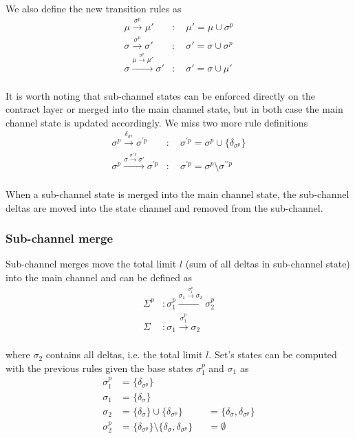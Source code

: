 \documentclass{llncs}
\begin{document}
We also define the new transition rules as
\begin{equation*}
\begin{split}
    \mu \xrightarrow{\sigma^p} \mu' &: \quad \mu' = \mu \cup \sigma^p \\
    \sigma \xrightarrow{\sigma^p} \sigma' &: \quad \sigma' = \sigma \cup \sigma^p \\
    \sigma \xrightarrow{\mu \xrightarrow{\sigma^p} \mu'} \sigma' &: \quad \sigma' = \sigma \cup \mu' \\
\end{split}
\end{equation*}

It is worth noting that sub-channel states can be enforced directly on the contract layer or merged into the main channel state, but in both case the main channel state is updated accordingly. We miss two more rule definitions
\begin{equation*}
\begin{split}
    \sigma^p \xrightarrow{\delta_{\sigma^p}} \sigma^{\prime p} &: \quad \sigma^{\prime p} = \sigma^p \cup \{ \delta_{\sigma^p} \} \\
    \sigma^p \xrightarrow{\sigma \xrightarrow{\sigma^{\prime\prime p}} \sigma'} \sigma^{\prime p} &: \quad \sigma^{\prime p} = \sigma^p \setminus \sigma^{\prime\prime p} \\
\end{split}
\end{equation*}

When a sub-channel state is merged into the main channel state, the sub-channel deltas are moved into the state channel and removed from the sub-channel.

\subsubsection{Sub-channel merge} Sub-channel merges move the total limit $l$ (sum of all deltas in sub-channel state) into the main channel and can be defined as
\begin{equation*}
\begin{split}
    \Sigma^p&: \sigma_1^p \xrightarrow{\sigma_1 \xrightarrow{\sigma_1^p} \sigma_2} \sigma_2^p \\
    \Sigma&: \sigma_1 \xrightarrow{\sigma_1^p} \sigma_2 \\
\end{split}
\end{equation*}

where $\sigma_2$ contains all deltas, i.e. the total limit $l$. Set's states can be computed with the previous rules given the base states $\sigma^p_1$ and $\sigma_1$ as
\begin{align*}
    \sigma^p_1 &= \{\delta_{\sigma^p}\} \\
    \sigma_1   &= \{\delta_\sigma\} \\
    \sigma_2   &= \{\delta_\sigma\} \cup \{\delta_{\sigma^p}\} & &= \{\delta_\sigma,\delta_{\sigma^p}\} \\
    \sigma^p_2 &= \{\delta_{\sigma^p}\} \setminus \{\delta_\sigma,\delta_{\sigma^p}\} & &= \emptyset
\end{align*}
\end{document}
